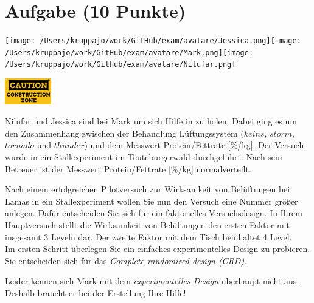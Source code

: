 \documentclass[a4paper, 9pt]{scrartcl}\usepackage[]{graphicx}\usepackage[]{xcolor}
\begin{document}
\section{Aufgabe \hfill (10 Punkte)}


 
\begin{minipage}[t]{0.5\textwidth}
\texttt{[image: /Users/kruppajo/work/GitHub/exam/avatare/Jessica.png]}\hspace{-4mm}\texttt{[image: /Users/kruppajo/work/GitHub/exam/avatare/Mark.png]}\hspace{-4mm}\texttt{[image: /Users/kruppajo/work/GitHub/exam/avatare/Nilufar.png]}
\end{minipage}
\begin{minipage}[t]{0.5\textwidth}
\hfill
\href{https://youtu.be/wJqsNV1hOW8}{\includegraphics[width = 2cm]{img/caution}}
\end{minipage}
\vspace{1ex}



Nilufar und Jessica sind bei Mark um sich Hilfe in \Rlogo zu holen. Dabei ging es um den Zusammenhang zwischen der Behandlung Lüftungssystem ($keins$, $storm$, $tornado$ und $thunder$) und dem Messwert Protein/Fettrate [\%/kg]. Der Versuch wurde in ein Stallexperiment im Teuteburgerwald durchgeführt. Nach sein Betreuer ist der Messwert Protein/Fettrate [\%/kg] normalverteilt.

Nach einem erfolgreichen Pilotversuch zur Wirksamkeit von Belüftungen bei Lamas in ein Stallexperiment wollen Sie nun den Versuch eine Nummer größer anlegen. Dafür entscheiden Sie sich für ein faktorielles Versuchsdesign. In Ihrem Hauptversuch stellt die Wirksamkeit von Belüftungen den ersten Faktor mit insgesamt 3 Leveln dar. Der zweite Faktor mit dem Tisch beinhaltet 4 Level. \\

Im ersten Schritt überlegen Sie ein einfaches experimentelles Design zu probieren. Sie entscheiden sich für das \textit{Complete randomized design (CRD)}.

Leider kennen sich Mark mit dem \textit{experimentelles Design} überhaupt nicht aus. Deshalb braucht er bei der Erstellung Ihre Hilfe!
\end{document}
